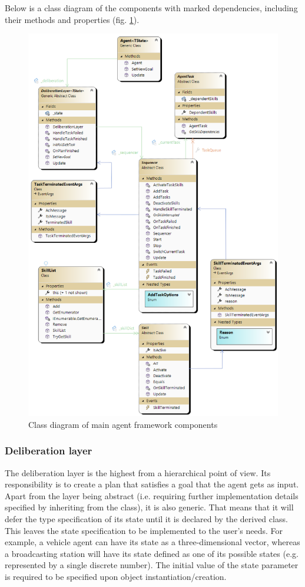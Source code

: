 \documentclass[0main.tex]{subfiles}
\begin{document}
Below is a class diagram of the components with marked dependencies, including their methods and 
properties (fig. \ref{mas-its-components}).


\begin{figure}[htbp]
    \centering
    \includegraphics[width=.9\textwidth]{MAS-ITS-Components.png}
    \caption{Class diagram of main agent framework components}
    \label{mas-its-components}
\end{figure}

\subsubsection{Deliberation layer}

The deliberation layer is the highest from a hierarchical point of view. Its responsibility is to 
create a plan that satisfies a goal that the agent gets as input. Apart from the layer 
being abstract (i.e. requiring further implementation details specified by inheriting from the 
class), it is also generic. That means that it will defer the type specification of its state until 
it is declared by the derived class. This leaves the state specification to be implemented 
to the user's needs. For example, a vehicle agent can have its state as a three-dimensional
vector, whereas a broadcasting station will have its state defined as one of its possible
states (e.g. represented by a single discrete number).  The initial value of the state parameter
is required to be specified upon object instantiation/creation.
\end{document}
